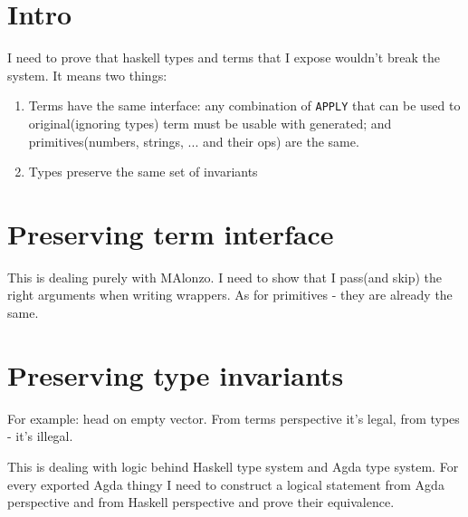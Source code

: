 \section{Intro}

I need to prove that haskell types and terms that I expose wouldn't break the system.  It means two things:
\begin{enumerate}
\item Terms have the same interface: any combination of \texttt{APPLY} that can be used to original(ignoring types)
      term must be usable with generated; and primitives(numbers, strings, ... and their ops) are the same.
\item Types preserve the same set of invariants
\end{enumerate}

\section{Preserving term interface}

This is dealing purely with MAlonzo. I need to show that I pass(and skip) the right arguments when writing wrappers.
As for primitives - they are already the same.

\section{Preserving type invariants}

For example: head on empty vector. From terms perspective it's legal, from types - it's illegal.

This is dealing with logic behind Haskell type system and Agda type system.
For every exported Agda thingy I need to construct a logical statement from
Agda perspective and from Haskell perspective and prove their equivalence.
